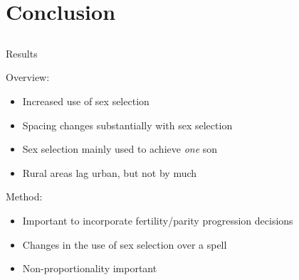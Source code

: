 \documentclass[red]{beamer}
\begin{document}





\section{Conclusion}
\subsection{}

\begin{frame}{Results}
 
Overview:
\begin{itemize}
\item Increased use of sex selection
\item Spacing changes substantially with sex selection
\item Sex selection mainly used to achieve \emph{one} son 
\item Rural areas lag urban, but not by much
\end{itemize}

\bigskip

Method:
\begin{itemize}
\item Important to incorporate fertility/parity progression decisions
\item Changes in the use of sex selection over a spell 
\item Non-proportionality important
\end{itemize}

\end{frame}
\end{document}
